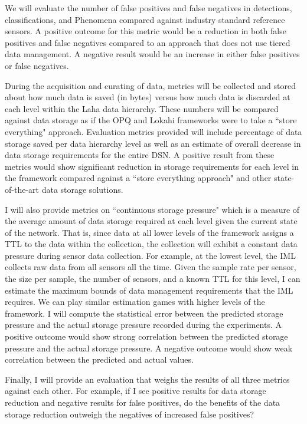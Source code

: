 We will evaluate the number of false positives and false negatives in detections, classifications, and Phenomena compared against industry standard reference sensors. A positive outcome for this metric would be a reduction in both false positives and false negatives compared to an approach that does not use tiered data management. A negative result would be an increase in either false positives or false negatives. 

During the acquisition and curating of data, metrics will be collected and stored about how much data is saved (in bytes) versus how much data is discarded at each level within the Laha data hierarchy. These numbers will be compared against data storage as if the OPQ and Lokahi frameworks were to take a ``store everything" approach. Evaluation metrics provided will include percentage of data storage saved per data hierarchy level as well as an estimate of overall decrease in data storage requirements for the entire DSN. A positive result from these metrics would show significant reduction in storage requirements for each level in the framework compared against a ``store everything approach" and other state-of-the-art data storage solutions.

I will also provide metrics on ``continuous storage pressure" which is a measure of the average amount of data storage required at each level given the current state of the network. That is, since data at all lower levels of the framework assigns a TTL to the data within the collection, the collection will exhibit a constant data pressure during sensor data collection. For example, at the lowest level, the IML collects raw data from all sensors all the time. Given the sample rate per sensor, the size per sample, the number of sensors, and a known TTL for this level, I can estimate the maximum bounds of data management requirements that the IML requires. We can play similar estimation games with higher levels of the framework. I will compute the statistical error between the predicted storage pressure and the actual storage pressure recorded during the experiments. A positive outcome would show strong correlation between the predicted storage pressure and the actual storage pressure. A negative outcome would show weak correlation between the predicted and actual values.

Finally, I will provide an evaluation that weighs the results of all three metrics against each other. For example, if I see positive results for data storage reduction and negative results for false positives, do the benefits of the data storage reduction outweigh the negatives of increased false positives?

